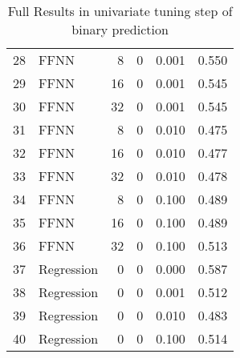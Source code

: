 \begin{table}[ht]
\begin{tabular}{rlrrrr}
  28 & FFNN &    8 &    0 & 0.001 & 0.550 \\ 
  29 & FFNN &   16 &    0 & 0.001 & 0.545 \\ 
  30 & FFNN &   32 &    0 & 0.001 & 0.545 \\ 
  31 & FFNN &    8 &    0 & 0.010 & 0.475 \\ 
  32 & FFNN &   16 &    0 & 0.010 & 0.477 \\ 
  33 & FFNN &   32 &    0 & 0.010 & 0.478 \\ 
  34 & FFNN &    8 &    0 & 0.100 & 0.489 \\ 
  35 & FFNN &   16 &    0 & 0.100 & 0.489 \\ 
  36 & FFNN &   32 &    0 & 0.100 & 0.513 \\ 
  37 & Regression &    0 &    0 & 0.000 & 0.587 \\ 
  38 & Regression &    0 &    0 & 0.001 & 0.512 \\ 
  39 & Regression &    0 &    0 & 0.010 & 0.483 \\ 
  40 & Regression &    0 &    0 & 0.100 & 0.514 \\ 
   \hline
\end{tabular}
\caption{Full Results in univariate tuning step of binary prediction} 
\label{tab:binary.par.tuning.full}
\end{table}
